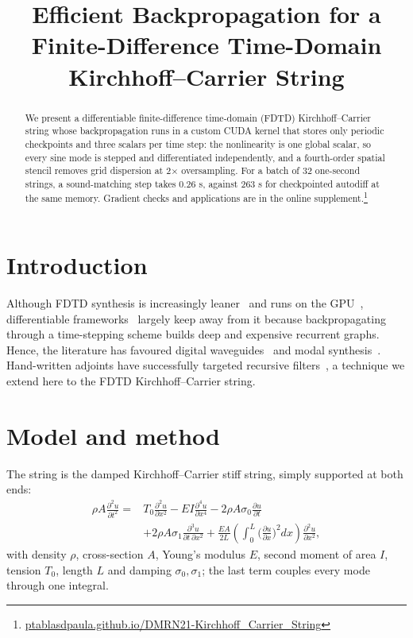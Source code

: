 \documentclass[a4paper]{article}
\title{Efficient Backpropagation for a Finite-Difference Time-Domain Kirchhoff--Carrier String}
\providecommand{\bstctlentry}[1]{\nocite{#1}}
\begin{document}
\bstctlentry{BSTcontrol}
\ninept
\maketitle
\begin{sloppy}
\begin{abstract}
We present a differentiable finite-difference time-domain (FDTD)
Kirchhoff--Carrier string whose
backpropagation runs in a custom CUDA kernel that stores only periodic
checkpoints and three scalars per time step: the nonlinearity is one global
scalar, so every sine mode is stepped and differentiated independently, and
a fourth-order spatial stencil removes grid dispersion at 2$\times$
oversampling. For a batch of 32 one-second strings, a sound-matching step
takes 0.26 s, against 263 s for checkpointed autodiff at the same memory.
Gradient checks and applications are in the online
supplement.\footnote{\fontsize{6}{7}\selectfont\url{ptablasdpaula.github.io/DMRN21-Kirchhoff_Carrier_String}}
\end{abstract}

\section{Introduction}
Although FDTD synthesis is increasingly leaner~\cite{bilbao2024guitar} and
runs on the GPU~\cite{lee2024string}, differentiable
frameworks~\cite{hayes2024review} largely keep away from it because
backpropagating through a time-stepping scheme builds deep and expensive
recurrent graphs. Hence, the
literature has favoured digital waveguides~\cite{tablas2026sound} and modal
synthesis~\cite{diaz2025}. Hand-written adjoints have successfully targeted
recursive filters~\cite{yu2024allpole}, a technique we extend here to the
FDTD Kirchhoff--Carrier string.

\section{Model and method}
The string is the damped Kirchhoff--Carrier stiff string, simply supported at
both ends:
\begin{equation}
\begin{aligned}
\rho A\frac{\partial^2u}{\partial t^2}={}&T_0\frac{\partial^2u}{\partial x^2}
 -EI\frac{\partial^4u}{\partial x^4}
 -2\rho A\sigma_0\frac{\partial u}{\partial t}\\
 &+2\rho A\sigma_1\frac{\partial^3u}{\partial t\,\partial x^2}
 +\frac{EA}{2L}\!\left(\int_0^L\Big(\frac{\partial u}{\partial x}\Big)^2dx\right)
 \frac{\partial^2u}{\partial x^2},
\end{aligned}
\label{eq:pde}
\end{equation}
with density $\rho$, cross-section $A$, Young's modulus $E$, second moment of
area $I$, tension $T_0$, length $L$ and damping $\sigma_0,\sigma_1$; the last
term couples every mode through one integral.


\end{sloppy}
\end{document}
